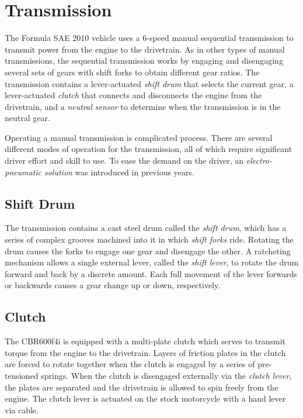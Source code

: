 \section{Transmission}
\label{sec:background_transmission}

The Formula SAE 2010 vehicle uses a 6-speed manual sequential transmission to transmit power from the engine to the drivetrain. As in other types of manual transmissions, the sequential transmission works by engaging and disengaging several sets of gears with shift forks to obtain different gear ratios. The transmission contains a lever-actuated \emph{shift drum} that selects the current gear, a lever-actuated \emph{clutch} that connects and disconnects the engine from the drivetrain, and a \emph{neutral sensor} to determine when the transmission is in the neutral gear. 

Operating a manual transmission is complicated process. There are several different modes of operation for the transmission, all of which require significant driver effort and skill to use. To ease the demand on the driver, an \emph{electro-pneumatic solution} was introduced in previous years.

\subsection{Shift Drum}

The transmission contains a cast steel drum called the \emph{shift drum}, which has a series of complex grooves machined into it in which \emph{shift forks} ride. Rotating the drum causes the forks to engage one gear and disengage the other. A ratcheting mechanism allows a single external lever, called the \emph{shift lever}, to rotate the drum forward and back by a discrete amount. Each full movement of the lever forwards or backwards causes a gear change up or down, respectively. 

\subsection{Clutch}

The CBR600f4i is equipped with a multi-plate clutch which serves to transmit torque from the engine to the drivetrain. Layers of friction plates in the clutch are forced to rotate together when the clutch is engaged by a series of pre-tensioned springs. When the clutch is disengaged externally via the \emph{clutch lever}, the plates are separated and the drivetrain is allowed to spin freely from the engine. The clutch lever is actuated on the stock motorcycle with a hand lever via cable.

